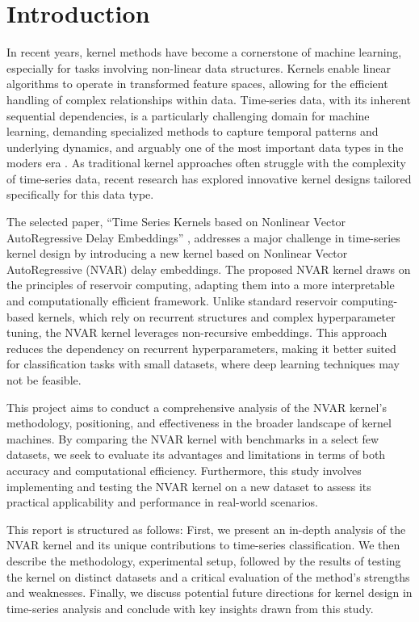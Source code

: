 \chapter{Introduction} \label{chap:intro}

In recent years, kernel methods have become a cornerstone of machine learning, especially for tasks involving non-linear data structures. Kernels enable linear algorithms to operate in transformed feature spaces, allowing for the efficient handling of complex relationships within data. Time-series data, with its inherent sequential dependencies, is a particularly challenging domain for machine learning, demanding specialized methods to capture temporal patterns and underlying dynamics, and arguably one of the most important data types in the moders era \cite{hamilton1994, strogatz2018, zhang2017, zeroual2020}. As traditional kernel approaches often struggle with the complexity of time-series data, recent research has explored innovative kernel designs tailored specifically for this data type.

The selected paper, ``Time Series Kernels based on Nonlinear Vector AutoRegressive Delay Embeddings'' \cite{felice2023}, addresses a major challenge in time-series kernel design by introducing a new kernel based on Nonlinear Vector AutoRegressive (NVAR) delay embeddings. The proposed NVAR kernel draws on the principles of reservoir computing, adapting them into a more interpretable and computationally efficient framework. Unlike standard reservoir computing-based kernels, which rely on recurrent structures and complex hyperparameter tuning, the NVAR kernel leverages non-recursive embeddings. This approach reduces the dependency on recurrent hyperparameters, making it better suited for classification tasks with small datasets, where deep learning techniques may not be feasible.

This project aims to conduct a comprehensive analysis of the NVAR kernel's methodology, positioning, and effectiveness in the broader landscape of kernel machines. By comparing the NVAR kernel with benchmarks in a select few datasets, we seek to evaluate its advantages and limitations in terms of both accuracy and computational efficiency. Furthermore, this study involves implementing and testing the NVAR kernel on a new dataset to assess its practical applicability and performance in real-world scenarios.

This report is structured as follows: First, we present an in-depth analysis of the NVAR kernel and its unique contributions to time-series classification. We then describe the methodology, experimental setup, followed by the results of testing the kernel on distinct datasets and a critical evaluation of the method's strengths and weaknesses. Finally, we discuss potential future directions for kernel design in time-series analysis and conclude with key insights drawn from this study.
